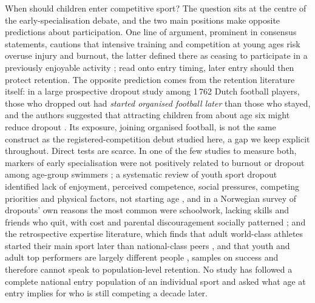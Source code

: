 \documentclass[12pt,a4paper]{article}
\begin{document}
When should children enter competitive sport? The question sits at the centre of the early-specialisation debate, and the two main positions make opposite predictions about participation. One line of argument, prominent in consensus statements, cautions that intensive training and competition at young ages risk overuse injury and burnout, the latter defined there as ceasing to participate in a previously enjoyable activity \cite{difiori2014}; read onto entry timing, later entry should then protect retention. The opposite prediction comes from the retention literature itself: in a large prospective dropout study among 1\,762 Dutch football players, those who dropped out had \emph{started organised football later} than those who stayed, and the authors suggested that attracting children from about age six might reduce dropout \cite{vanyperen2021}. Its exposure, joining organised football, is not the same construct as the registered-competition debut studied here, a gap we keep explicit throughout. Direct tests are scarce. In one of the few studies to measure both, markers of early specialisation were not positively related to burnout or dropout among age-group swimmers \cite{larson2019}; a systematic review of youth sport dropout identified lack of enjoyment, perceived competence, social pressures, competing priorities and physical factors, not starting age \cite{crane2015}, and in a Norwegian survey of dropouts' own reasons the most common were schoolwork, lacking skills and friends who quit, with cost and parental discouragement socially patterned \cite{espedalen2022}; and the retrospective expertise literature, which finds that adult world-class athletes started their main sport later than national-class peers \cite{barth2022}, and that youth and adult top performers are largely different people \cite{gullich2025}, samples on success and therefore cannot speak to population-level retention. No study has followed a complete national entry population of an individual sport and asked what age at entry implies for who is still competing a decade later.
\end{document}
